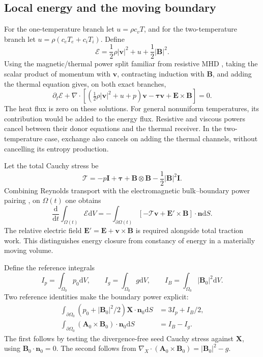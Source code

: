 \documentclass[11pt,a4paper]{article}
\theoremstyle{remark}\newtheorem{remark}{Remark}
\numberwithin{equation}{section}
\newcommand{\dd}{\mathrm{d}}
\newcommand{\vv}{\boldsymbol v}
\newcommand{\BB}{\boldsymbol B}
\newcommand{\Avec}{\boldsymbol A}
\newcommand{\EE}{\boldsymbol E}
\newcommand{\XX}{\boldsymbol X}
\newcommand{\nn}{\boldsymbol n}
\newcommand{\ttau}{\boldsymbol\tau}
\newcommand{\Id}{\boldsymbol I}
\newcommand{\grad}{\nabla}
\newcommand{\diver}{\nabla\!\cdot}
\begin{document}
\subsection{Local energy and the moving boundary}
For the one-temperature branch let $u=\rho c_vT$, and for the two-temperature branch let $u=\rho(c_eT_e+c_iT_i)$. Define
\begin{equation}
\mathcal E=\frac12\rho|\vv|^2+u+\frac12|\BB|^2.
\label{eq:energydef}
\end{equation}
Using the magnetic/thermal power split familiar from resistive MHD \citep{Carlier,Gawlik2025}, taking the scalar product of momentum with $\vv$, contracting induction with $\BB$, and adding the thermal equation gives, on both exact branches,
\begin{equation}
\partial_t\mathcal E+
\diver\left[(\tfrac12\rho|\vv|^2+u+p)\vv
-\ttau\vv+\EE\times\BB\right]=0.
\label{eq:localenergy}
\end{equation}
The heat flux is zero on these solutions. For general nonuniform temperatures, its contribution would be added to the energy flux. Resistive and viscous powers cancel between their donor equations and the thermal receiver. In the two-temperature case, exchange also cancels on adding the thermal channels, without cancelling its entropy production.

Let the total Cauchy stress be
\begin{equation}
\boldsymbol{\mathcal T}=-p\Id+\ttau+\BB\otimes\BB-\frac12|\BB|^2\Id.
\label{eq:totalstress}
\end{equation}
Combining Reynolds transport with the electromagnetic bulk--boundary power pairing \citep{PortHamiltonian,RenMultiChannel}, on $\Omega(t)$ one obtains
\begin{equation}
\frac{\dd}{\dd t}\int_{\Omega(t)}\mathcal E\dd V
=-\int_{\partial\Omega(t)}
[-\boldsymbol{\mathcal T}\vv+\EE'\times\BB]\cdot\nn\dd S.
\label{eq:movingenergy}
\end{equation}
The relative electric field $\EE'=\EE+\vv\times\BB$ is required alongside total traction work. This distinguishes energy closure from constancy of energy in a materially moving volume.

Define the reference integrals
\begin{equation}
I_p=\int_{\Omega_0}p_0\dd V,\qquad
I_g=\int_{\Omega_0}g\dd V,\qquad
I_B=\int_{\Omega_0}|\BB_0|^2\dd V.
\label{eq:integrals}
\end{equation}
Two reference identities make the boundary power explicit:
\begin{equation}
\begin{aligned}
\int_{\partial\Omega_0}(p_0+|\BB_0|^2/2)\XX\cdot\nn_0\dd S
&=3I_p+I_B/2,\\
\int_{\partial\Omega_0}(\Avec_0\times\BB_0)\cdot\nn_0\dd S
&=I_B-I_g.
\end{aligned}
\label{eq:referenceports}
\end{equation}
The first follows by testing the divergence-free seed Cauchy stress against $\XX$, using $\BB_0\cdot\nn_0=0$. The second follows from $\grad_X\cdot(\Avec_0\times\BB_0)=|\BB_0|^2-g$.
\end{document}
